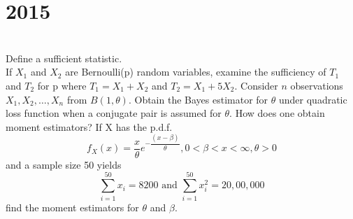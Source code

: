 \section*{2015}
\vspace{-.5cm}
\hrulefill \smallskip\\
 Define a sufficient statistic. \\ If $X_1$ and $X_2$ are Bernoulli(p) random variables, examine the sufficiency of $T_1$ and $T_2$ for p where $T_1 = X_1 + X_2$ and $T_2=X_1+5X_2$.
\myline
{} Consider $n$ observations $X_1,X_2,\ldots,X_n$ from $B(1,\theta)$. Obtain the Bayes estimator for $\theta$ under quadratic loss function when a conjugate pair is assumed for $\theta$.
\myline
{} How does one obtain moment estimators? If X has the p.d.f. \[ f_X(x) = \dfrac{x}{\theta}e^{-\dfrac{(x -\beta)}{\theta}},0<\beta<x<\infty, \theta > 0\] and a sample size 50 yields \[ \sum_{i=1}^{50}x_i = 8200 \text{ and } \sum_{i=1}^{50} x_i^2 = 20,00,000 \] find the moment estimators for $\theta$ and $\beta$.
